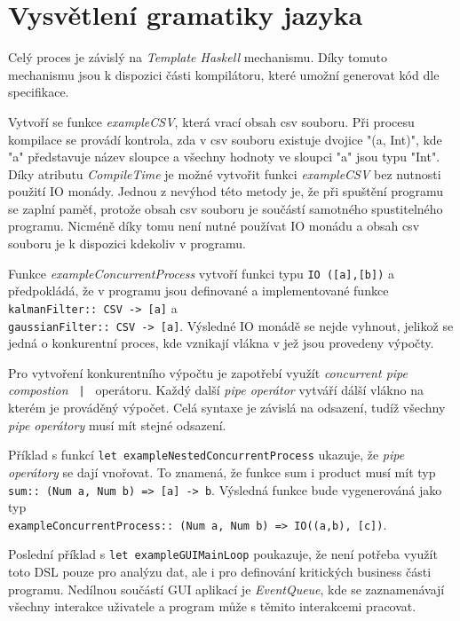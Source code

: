 \documentclass[male,czech]{kithesis}
\newcommand{\haskellInline}[1]{\colorbox{gray!10}{\texttt{#1}}}
\begin{document}
\section{Vysvětlení gramatiky jazyka}

Celý proces je závislý na \textit{Template Haskell} mechanismu. Díky tomuto mechanismu jsou k dispozici části kompilátoru, které umožní generovat kód dle specifikace.

Vytvoří se funkce \textit{exampleCSV}, která vrací obsah csv souboru. Při procesu kompilace se provádí kontrola, zda v csv souboru existuje dvojice "(a, Int)", kde "a" představuje název sloupce a všechny hodnoty ve sloupci "a" jsou typu "Int".
Díky atributu \textit{CompileTime} je možné vytvořit funkci \textit{exampleCSV} bez nutnosti použití IO monády. Jednou z nevýhod této metody je, že při spuštění programu se zaplní paměť, protože obsah csv souboru je součástí samotného spustitelného programu.
Nicméně díky tomu není nutné používat IO monádu a obsah csv souboru je k dispozici kdekoliv v programu.

Funkce \textit{exampleConcurrentProcess} vytvoří funkci typu \haskellInline{IO ([a],[b])} a předpokládá, že v programu jsou definované a implementované funkce
\haskellInline{kalmanFilter:: CSV -> [a]} a \\
\haskellInline{gaussianFilter:: CSV -> [a]}. Výsledné IO monádě se nejde vyhnout, jelikož se jedná o konkurentní proces, kde vznikají vlákna v jež jsou provedeny výpočty. 

Pro vytvoření konkurentního výpočtu je zapotřebí využít \textit{concurrent pipe compostion}
\haskellInline{ | } operátoru. Každý další \textit{pipe operátor} vytváří dálší vlákno na kterém je prováděný výpočet.
Celá syntaxe je závislá na odsazení, tudíž všechny \textit{pipe operátory} musí mít stejné odsazení.

Příklad s funkcí \haskellInline{let exampleNestedConcurrentProcess} ukazuje, 
že \textit{pipe operátory} se dají vnořovat. To znamená, že funkce sum i product musí mít typ
\haskellInline{sum:: (Num a, Num b) => [a] -> b}. Výsledná funkce bude vygenerováná jako typ \\
\haskellInline{exampleConcurrentProcess:: (Num a, Num b) => IO((a,b), [c])}.

Poslední příklad s \haskellInline{let exampleGUIMainLoop} poukazuje, že není potřeba využít toto DSL pouze pro analýzu dat, ale
i pro definování kritických business části programu. Nedílnou součástí GUI aplikací je \textit{EventQueue}, kde
se zaznamenávají všechny interakce uživatele a program může s těmito interakcemi pracovat.
\end{document}
